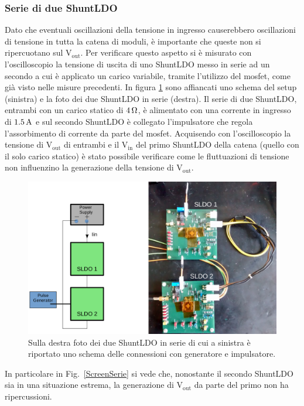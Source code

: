 \subsubsection{Serie di due ShuntLDO}

Dato che eventuali oscillazioni della tensione in ingresso causerebbero oscillazioni di tensione in tutta la catena di moduli, è importante che queste non si ripercuotano sul $\mathrm{V_{out}}$. 
Per verificare questo aspetto si è misurato con l'oscilloscopio la tensione di uscita di uno ShuntLDO messo in serie ad un secondo a cui è applicato un carico variabile, tramite l'utilizzo del mosfet, come già visto nelle misure precedenti.
In figura \ref{SLDOserie} sono affiancati uno schema del setup (sinistra) e la foto dei due ShuntLDO in serie (destra). 
Il serie di due ShuntLDO, entrambi con un carico statico di $4 {\rm \, \Omega}$, è alimentato con una corrente in ingresso di $1.5 \rm \, A$ e sul secondo ShuntLDO è collegato l'impulsatore che regola l'assorbimento di corrente  da parte del mosfet. 
Acquisendo con l'oscilloscopio la tensione di $\mathrm{V_{out}}$ di entrambi e il $\mathrm{V_{in}}$ del primo ShuntLDO della catena (quello con il solo carico statico) è stato possibile verificare come le fluttuazioni di tensione non influenzino la generazione della tensione di $\mathrm{V_{out}}$.
\begin{figure}[h!]
\centering
\includegraphics[scale=.30]{Immagini/SLDOserie}
\caption{Sulla destra foto dei due ShuntLDO in serie di cui a sinistra è riportato uno schema delle connessioni con generatore e impulsatore.}
\label{SLDOserie}
\end{figure}
In particolare in Fig.~\ref{ScreenSerie} si vede che, nonostante il secondo ShuntLDO sia in una situazione estrema, la generazione di $\mathrm{V_{out}}$ da parte del primo non ha ripercussioni. 
